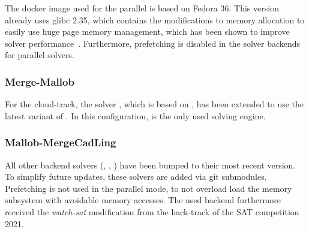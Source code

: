 \documentclass[conference]{IEEEtran}
\begin{document}
The docker image used for the parallel \mergesat is based on Fedora 36.
This version already uses glibc 2.35, which contains the modifications to memory allocation to easily use huge page memory management, which has been shown to improve solver performance~\cite{thp}.
Furthermore, prefetching is disabled in the solver backends for parallel solvers.

% 

% 

\subsubsection{Merge-Mallob}

For the cloud-track, the solver \mallob, which is based on \hordesat, has been extended to use the latest variant of \mergesat.
In this configuration, \mergesat is the only used solving engine.

\subsubsection{Mallob-MergeCadLing}

All other backend solvers (\cadical, \lingeling, \yalsat) have been bumped to their most recent version.
To simplify future updates, these solvers are added via git submodules.
Prefetching is not used in the parallel mode, to not overload load the memory subsystem with avoidable memory accesses.
% 
The used \cadical backend furthermore received the \emph{watch-sat} modification from the hack-track of the SAT competition 2021.
\end{document}
